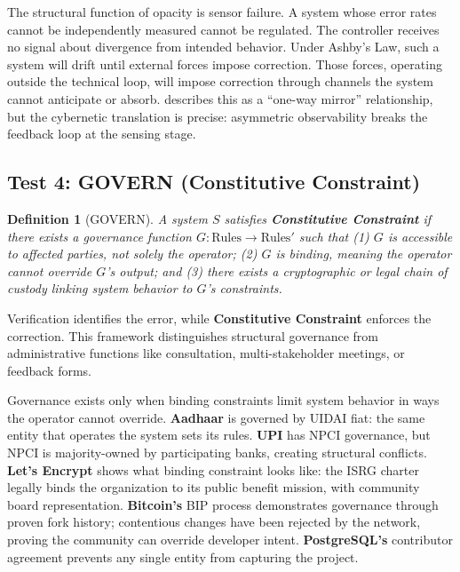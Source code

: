 \documentclass{article}
\newtheorem{definition}{Definition}
\begin{document}
The structural function of opacity is sensor failure. A system whose error rates cannot be independently measured cannot be regulated. The controller receives no signal about divergence from intended behavior. Under Ashby's Law, such a system will drift until external forces impose correction. Those forces, operating outside the technical loop, will impose correction through channels the system cannot anticipate or absorb. \citet{pasquale2015} describes this as a ``one-way mirror'' relationship, but the cybernetic translation is precise: asymmetric observability breaks the feedback loop at the sensing stage.

\subsection{Test 4: GOVERN (Constitutive Constraint)}

\begin{definition}[GOVERN]
\label{def:govern}
A system $S$ satisfies \textbf{Constitutive Constraint} if there exists a governance function $G: \text{Rules} \to \text{Rules}'$ such that (1) $G$ is accessible to affected parties, not solely the operator; (2) $G$ is binding, meaning the operator cannot override $G$'s output; and (3) there exists a cryptographic or legal chain of custody linking system behavior to $G$'s constraints.
\end{definition}

Verification identifies the error, while \textbf{Constitutive Constraint} enforces the correction. This framework distinguishes structural governance from administrative functions like consultation, multi-stakeholder meetings, or feedback forms.

Governance exists only when binding constraints limit system behavior in ways the operator cannot override. \textbf{Aadhaar} is governed by UIDAI fiat: the same entity that operates the system sets its rules. \textbf{UPI} has NPCI governance, but NPCI is majority-owned by participating banks, creating structural conflicts. \textbf{Let's Encrypt} shows what binding constraint looks like: the ISRG charter legally binds the organization to its public benefit mission, with community board representation. \textbf{Bitcoin's} BIP process demonstrates governance through proven fork history; contentious changes have been rejected by the network, proving the community can override developer intent. \textbf{PostgreSQL's} contributor agreement prevents any single entity from capturing the project.
\end{document}
